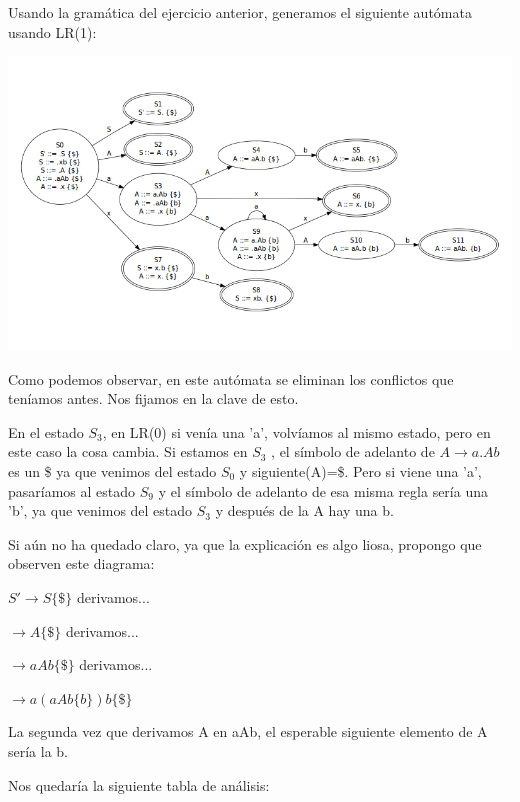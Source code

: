 \documentclass{apuntes}
\begin{document}
\begin{example}
Usando la gramática del ejercicio anterior, generamos el siguiente autómata usando LR(1):

\begin{center}
\includegraphics[scale=0.65]{img/automatalr1.jpg}
\end{center}

Como podemos observar, en este autómata se eliminan los conflictos que teníamos antes. Nos fijamos en la clave de esto.

En el estado $S_3$, en LR(0) si venía una 'a', volvíamos al mismo estado, pero en este caso la cosa cambia. Si estamos en $S_3$ , el símbolo de adelanto de $A \rightarrow a.Ab$ es un \$ ya que venimos del estado $S_0$ y siguiente(A)=\$. Pero si viene una 'a', pasaríamos al estado $S_9$ y el símbolo de adelanto de esa misma regla sería una 'b', ya que venimos del estado $S_3$ y después de la A hay una b.

Si aún no ha quedado claro, ya que la explicación es algo liosa, propongo que observen este diagrama:

$S' \rightarrow S \{\$\}$  derivamos...

$\rightarrow A \{\$\}$ derivamos...

$\rightarrow aAb \{\$\}$ derivamos...

$\rightarrow a(aAb\{b\})b \{\$\}$

La segunda vez que derivamos A en aAb, el esperable siguiente elemento de A sería la b.

Nos quedaría la siguiente tabla de análisis:


\end{example}
\end{document}
